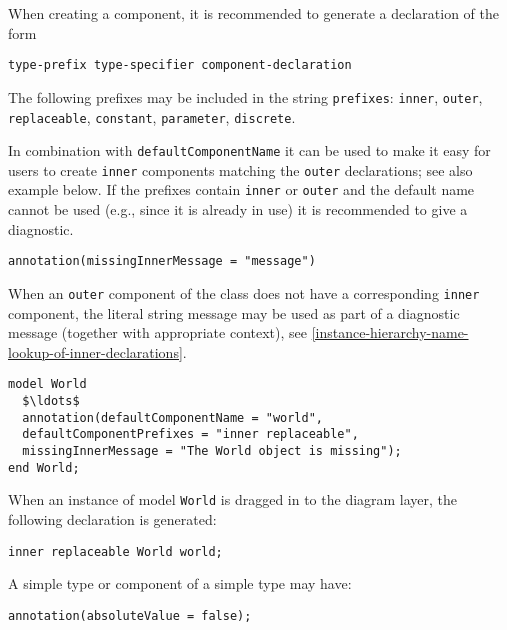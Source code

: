 When creating a component, it is recommended to generate a declaration of the form
\begin{lstlisting}[language=grammar]
type-prefix type-specifier component-declaration
\end{lstlisting}

The following prefixes may be included in the string \lstinline!prefixes!: \lstinline!inner!,
\lstinline!outer!, \lstinline!replaceable!, \lstinline!constant!, \lstinline!parameter!, \lstinline!discrete!.

\begin{nonnormative}
In combination with \lstinline!defaultComponentName! it can be used to make it easy for users to create \lstinline!inner! components matching the \lstinline!outer! declarations; see also example below.
If the prefixes contain \lstinline!inner! or \lstinline!outer! and the default name cannot be used (e.g., since it is already in use) it is recommended to give a diagnostic.
\end{nonnormative}

\begin{lstlisting}[language=modelica]
annotation(missingInnerMessage = "message")
\end{lstlisting}%

When an \lstinline!outer! component of the class does not have a corresponding \lstinline!inner!
component, the literal string message may be used as part of a diagnostic message (together with appropriate context), see \cref{instance-hierarchy-name-lookup-of-inner-declarations}.

\begin{example}
\begin{lstlisting}[language=modelica]
model World
  $\ldots$
  annotation(defaultComponentName = "world",
  defaultComponentPrefixes = "inner replaceable",
  missingInnerMessage = "The World object is missing");
end World;
\end{lstlisting}
When an instance of model \lstinline!World! is dragged in to the diagram layer, the following declaration is generated:
\begin{lstlisting}[language=modelica]
inner replaceable World world;
\end{lstlisting}
\end{example}

A simple type or component of a simple type may have:
\begin{lstlisting}[language=modelica]
annotation(absoluteValue = false);
\end{lstlisting}%

